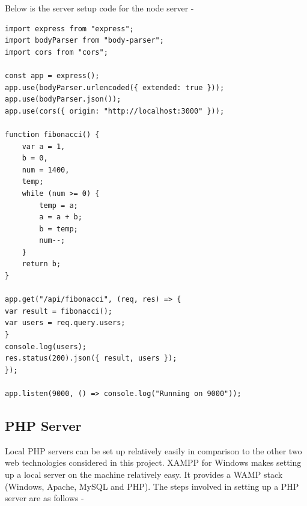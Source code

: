 \documentclass[../thesis.tex]{subfiles}
\begin{document}
	Below is the server setup code for the node server - 
	
\begin{lstlisting}[caption='Fibonacci module code for Node server']
import express from "express";
import bodyParser from "body-parser";
import cors from "cors";
		
const app = express();		
app.use(bodyParser.urlencoded({ extended: true }));
app.use(bodyParser.json());
app.use(cors({ origin: "http://localhost:3000" }));

function fibonacci() {
	var a = 1,
	b = 0,
	num = 1400,
	temp;		
	while (num >= 0) {
		temp = a;
		a = a + b;
		b = temp;
		num--;
	}		
	return b;
}

app.get("/api/fibonacci", (req, res) => {
var result = fibonacci();
var users = req.query.users;
}
console.log(users);
res.status(200).json({ result, users });
});

app.listen(9000, () => console.log("Running on 9000"));		
\end{lstlisting}
	
	\subsection*{PHP Server}
	Local PHP servers can be set up relatively easily in comparison to the other two web technologies considered in this project. XAMPP for Windows makes setting up a local server on the machine relatively easy. It provides a WAMP stack (Windows, Apache, MySQL and PHP). The steps involved in setting up a PHP server are as follows -
	\newline
\end{document}
